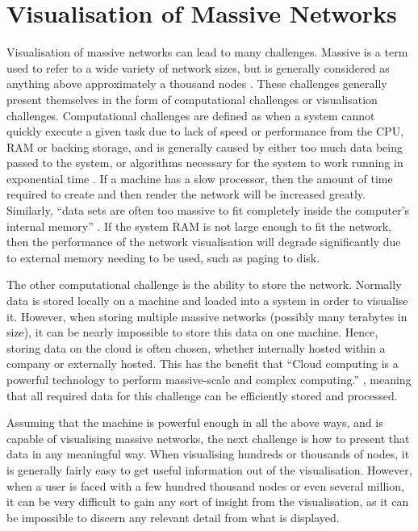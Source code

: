 \documentclass[../dissertation.tex]{subfiles}
\begin{document}
\section{Visualisation of Massive Networks}

Visualisation of massive networks can lead to many challenges. Massive is a term used to refer to a wide variety of network sizes, but is generally considered as anything above approximately a thousand nodes \cite{batagelj1998pajek}. These challenges generally present themselves in the form of computational challenges or visualisation challenges. Computational challenges are defined as when a system cannot quickly execute a given task due to lack of speed or performance from the CPU, RAM or backing storage, and is generally caused by either too much data being passed to the system, or algorithms necessary for the system to work running in exponential time \cite{baker1994approximation}. If a machine has a slow processor, then the amount of time required to create and then render the network will be increased greatly. Similarly, ``data sets are often too massive to fit completely inside the computer's internal memory'' \cite{abello2013handbook}. If the system RAM is not large enough to fit the network, then the performance of the network visualisation will degrade significantly due to external memory needing to be used, such as paging to disk. 

The other computational challenge is the ability to store the network. Normally data is stored locally on a machine and loaded into a system in order to visualise it. However, when storing multiple massive networks (possibly many terabytes in size), it can be nearly impossible to store this data on one machine. Hence, storing data on the cloud is often chosen, whether internally hosted within a company or externally hosted. This has the benefit that ``Cloud computing is a powerful technology to perform massive-scale and complex computing.'' \cite{hashem2015rise}, meaning that all required data for this challenge can be efficiently stored and processed.

Assuming that the machine is powerful enough in all the above ways, and is capable of visualising massive networks, the next challenge is how to present that data in any meaningful way. When visualising hundreds or thousands of nodes, it is generally fairly easy to get useful information out of the visualisation. However, when a user is faced with a few hundred thousand nodes or even several million, it can be very difficult to gain any sort of insight from the visualisation, as it can be impossible to discern any relevant detail from what is displayed. 
\end{document}
